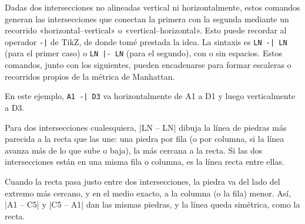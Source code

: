 
Dadas dos intersecciones no alineadas vertical ni horizontalmente, estos comandos generan las intersecciones que conectan la primera con la segunda mediante un recorrido «horizontal--vertical» o «vertical--horizontal». Esto puede recordar al operador \verb+-|+ de TikZ, de donde tomé prestada la idea. La sintaxis es \verb+LN -| LN+ (para el primer caso) o \verb+LN |- LN+ (para el segundo), con o sin espacios. Estos comandos, junto con los siguientes, pueden encadenarse para formar escaleras o recorridos propios de la m\'etrica de Manhattan.

\begin{codeexample}[width=6cm]
	\begin{goban}[label = {at = all}]
	\end{goban}
\end{codeexample}

En este ejemplo, \verb+A1 -| D3+ va horizontalmente de A1 a D1 y luego verticalmente a D3.


Para dos intersecciones cualesquiera, |LN -- LN| dibuja la línea de piedras más parecida a la recta que las une: una piedra por fila (o por columna, si la línea avanza más de lo que sube o baja), la más cercana a la recta. Si las dos intersecciones están en una misma fila o columna, es la línea recta entre ellas.

\begin{codeexample}[width=6cm]
	\begin{goban}[label = {at = all}]
	\end{goban}
\end{codeexample}

Cuando la recta pasa justo entre dos intersecciones, la piedra va del lado del extremo más cercano, y en el medio exacto, a la columna (o la fila) menor. Así, |A1 -- C5| y |C5 -- A1| dan las mismas piedras, y la línea queda simétrica, como la recta.


